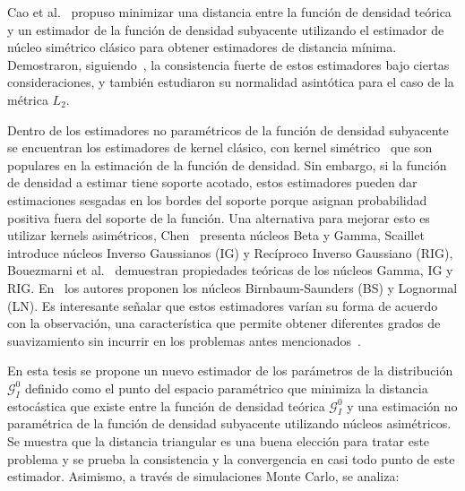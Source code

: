 Cao et al.~\cite {cao1995minimum} propuso minimizar una distancia entre la función de densidad teórica y un estimador de la función de densidad subyacente utilizando el estimador de núcleo simétrico clásico para obtener estimadores de distancia mínima. Demostraron, siguiendo~\cite{parr1982}, la consistencia fuerte de estos estimadores bajo ciertas consideraciones, y también estudiaron su normalidad asintótica para el caso de la métrica $ L_2 $.


Dentro de los estimadores no paramétricos de la función de densidad subyacente se encuentran los estimadores de kernel clásico, con kernel simétrico~\cite{Silverman1986} que son populares en la estimación de la función de densidad. Sin embargo, si la función de densidad a estimar tiene soporte acotado, estos estimadores pueden dar estimaciones sesgadas en los bordes del soporte porque asignan probabilidad positiva fuera del soporte de la función. Una alternativa para mejorar esto es utilizar kernels asimétricos, Chen~\cite{chen1999, chensx2000} presenta núcleos Beta y Gamma, Scaillet~\cite {Scaillet2004} introduce núcleos Inverso Gaussianos (IG) y Recíproco Inverso Gaussiano (RIG), Bouezmarni et al.~\cite {bouezmarni2005} demuestran propiedades teóricas de los núcleos Gamma, IG y RIG. En~\cite{Jin2003} los autores proponen los núcleos Birnbaum-Saunders (BS) y Lognormal (LN). Es interesante señalar que  estos estimadores varían su forma de acuerdo con la observación, una característica que permite obtener diferentes grados de suavizamiento sin incurrir en los problemas antes mencionados~\cite{Scaillet2004}. 

En esta tesis se propone un nuevo  estimador de los parámetros de la distribución $\mathcal{G}_I^0$ definido como el punto del espacio paramétrico que minimiza la distancia estocástica que existe entre la función de densidad teórica $\mathcal{G}_I^0$ y una estimación no paramétrica de la función de densidad subyacente utilizando núcleos asimétricos. Se muestra que la distancia triangular es una buena elección para tratar este problema y se prueba la consistencia y la convergencia en casi todo punto de este estimador. Asimismo, a través de simulaciones Monte Carlo, se analiza:

